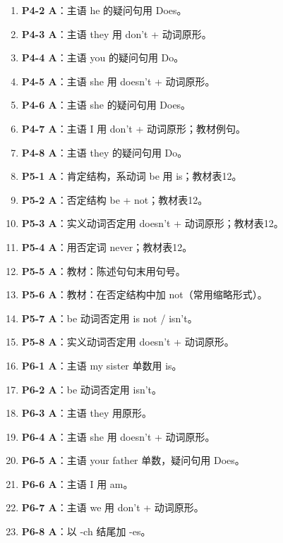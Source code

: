 \documentclass[11pt,a4paper]{ctexart}
\begin{document}
\begin{enumerate}[leftmargin=1.6em,itemsep=2pt]
\item \textbf{P4-2 A}：主语 he 的疑问句用 Does。
\item \textbf{P4-3 A}：主语 they 用 don’t + 动词原形。
\item \textbf{P4-4 A}：主语 you 的疑问句用 Do。
\item \textbf{P4-5 A}：主语 she 用 doesn’t + 动词原形。
\item \textbf{P4-6 A}：主语 she 的疑问句用 Does。
\item \textbf{P4-7 A}：主语 I 用 don’t + 动词原形；教材例句。
\item \textbf{P4-8 A}：主语 they 的疑问句用 Do。
\item \textbf{P5-1 A}：肯定结构，系动词 be 用 is；教材表12。
\item \textbf{P5-2 A}：否定结构 be + not；教材表12。
\item \textbf{P5-3 A}：实义动词否定用 doesn’t + 动词原形；教材表12。
\item \textbf{P5-4 A}：用否定词 never；教材表12。
\item \textbf{P5-5 A}：教材：陈述句句末用句号。
\item \textbf{P5-6 A}：教材：在否定结构中加 not（常用缩略形式）。
\item \textbf{P5-7 A}：be 动词否定用 is not / isn’t。
\item \textbf{P5-8 A}：实义动词否定用 doesn’t + 动词原形。
\item \textbf{P6-1 A}：主语 my sister 单数用 is。
\item \textbf{P6-2 A}：be 动词否定用 isn’t。
\item \textbf{P6-3 A}：主语 they 用原形。
\item \textbf{P6-4 A}：主语 she 用 doesn’t + 动词原形。
\item \textbf{P6-5 A}：主语 your father 单数，疑问句用 Does。
\item \textbf{P6-6 A}：主语 I 用 am。
\item \textbf{P6-7 A}：主语 we 用 don’t + 动词原形。
\item \textbf{P6-8 A}：以 -ch 结尾加 -es。
\end{enumerate}
\end{document}
